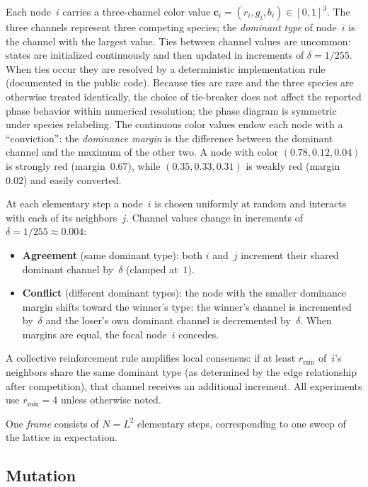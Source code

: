 \documentclass[preprint,12pt]{elsarticle}
\newcommand{\Lsys}{L}                 %
\newcommand{\rmin}{r_{\min}}           %
\begin{document}
Each node~$i$ carries a three-channel color value
$\bm{c}_i = (r_i, g_i, b_i) \in [0,1]^3$.
The three channels represent three competing species;
the \emph{dominant type} of node~$i$ is the channel
with the largest value.
Ties between channel values are uncommon: states are
initialized continuously and then updated in increments of
$\delta = 1/255$.
When ties occur they are resolved by a deterministic
implementation rule (documented in the public code).
Because ties are rare and the three species are otherwise
treated identically, the choice of tie-breaker does not affect
the reported phase behavior within numerical resolution; the
phase diagram is symmetric under species relabeling.
The continuous color values endow each node with a ``conviction'':
the \emph{dominance margin} is the difference between the
dominant channel and the maximum of the other two.
A node with color $(0.78, 0.12, 0.04)$ is strongly red
(margin~$0.67$), while $(0.35, 0.33, 0.31)$ is weakly red
(margin~$0.02$) and easily converted.

At each elementary step a node~$i$ is chosen uniformly at random
and interacts with each of its neighbors~$j$.
Channel values change in increments of
$\delta = 1/255 \approx 0.004$:
\begin{itemize}
  \item \textbf{Agreement} (same dominant type):
        both $i$ and~$j$ increment their shared dominant channel
        by~$\delta$ (clamped at~$1$).
  \item \textbf{Conflict} (different dominant types):
        the node with the smaller dominance margin shifts
        toward the winner's type:
        the winner's channel is incremented by~$\delta$ and the
        loser's own dominant channel is decremented by~$\delta$.
        When margins are equal, the focal node~$i$ concedes.
\end{itemize}

A collective reinforcement rule amplifies local consensus:
if at least $\rmin$ of~$i$'s neighbors share the same dominant
type (as determined by the edge relationship after competition),
that channel receives an additional increment.
All experiments use $\rmin = 4$ unless otherwise noted.

One \emph{frame} consists of $N = \Lsys^2$ elementary steps,
corresponding to one sweep of the lattice in expectation.

\subsection{Mutation}
\end{document}
